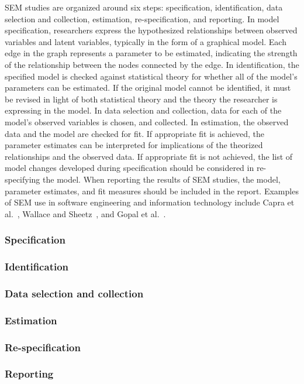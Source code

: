 SEM studies are organized around six steps: specification, identification, data selection and collection, estimation, re-specification, and reporting. In model specification, researchers express the hypothesized relationships between observed variables and latent variables, typically in the form of a graphical model. Each edge in the graph represents a parameter to be estimated, indicating the strength of the relationship between the nodes connected by the edge. In identification, the specified model is checked against statistical theory for whether all of the model’s parameters can be estimated. If the original model cannot be identified, it must be revised in light of both statistical theory and the theory the researcher is expressing in the model. In data selection and collection, data for each of the model’s observed variables is chosen, and collected. In estimation, the observed data and the model are checked for fit.  If appropriate fit is achieved, the parameter estimates can be interpreted for implications of the theorized relationships and the observed data. If appropriate fit is not achieved, the list of model changes developed during specification should be considered in re-specifying the model.  When reporting the results of SEM studies, the model, parameter estimates, and fit measures should be included in the report.
Examples of SEM use in software engineering and information technology include Capra et al.~\cite{capra2008empirical}, Wallace and Sheetz~\cite{wallace2014adoption}, and Gopal et al.~\cite{gopal2005impact}.

\subsubsection{Specification}
\subsubsection{Identification}
\subsubsection{Data selection and collection}
\subsubsection{Estimation}
\subsubsection{Re-specification}
\subsubsection{Reporting}


